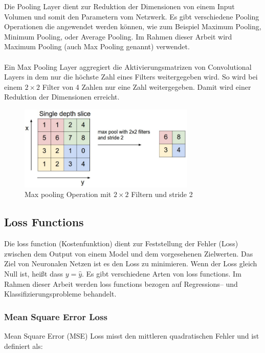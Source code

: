 Die Pooling Layer dient zur Reduktion der Dimensionen von einem Input Volumen und somit den Parametern vom Netzwerk. Es gibt 
verschiedene Pooling Operationen die angewendet werden können, wie zum Beispiel Maximum Pooling, Minimum Pooling, oder Average Pooling. Im Rahmen 
dieser Arbeit wird Maximum Pooling (auch Max Pooling genannt) verwendet.
\\
\\
Ein Max Pooling \gls{Layer} aggregiert die Aktivierungsmatrizen von Convolutional Layers in dem nur die höchste Zahl eines Filters weitergegeben 
wird. So wird bei einem $ 2 \times 2 $ Filter von 4 Zahlen nur eine Zahl weitergegeben. Damit wird einer Reduktion der Dimensionen erreicht.

\begin{figure}[H]
  \centering
  \includegraphics[width=0.75\textwidth]{resources/cnn/pooling.png}
  \caption{
    Max pooling Operation mit $ 2 \times 2 $ Filtern und \gls{stride} 2
    \cite{convnet-demo}
  }
  \label{image:pooling}
\end{figure}

\subsection{Loss Functions}
Die \gls{loss function} (Kostenfunktion) dient zur Feststellung der Fehler (Loss) zwischen dem Output von einem Model und dem vorgesehenen Zielwerten. 
Das Ziel von Neuronalen Netzen ist es den Loss zu minimieren. Wenn der Loss gleich Null ist, heißt dass $ y = \hat{y} $. Es gibt verschiedene Arten 
von \gls{loss function}s. Im Rahmen dieser Arbeit werden \gls{loss function}s bezogen auf Regressions– und Klassifizierungsprobleme behandelt.

\subsubsection{Mean Square Error Loss}
Mean Square Error (MSE) Loss misst den mittleren quadratischen Fehler und ist definiert als:

